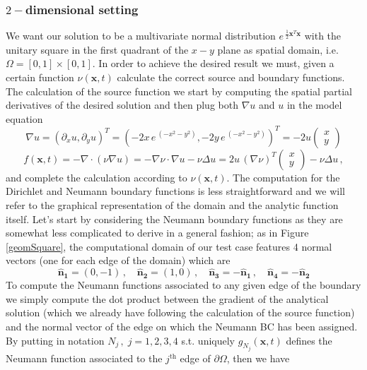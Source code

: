 \documentclass[12pt,openany,twoside,a4paper]{article}
\begin{document}
\subsubsection{$2-$dimensional setting}
We want our solution to be a multivariate normal distribution $e^{\:\frac{1}{2}\mathbf{x}^T\mathbf{x}}$ with the unitary square in the first quadrant of the $x-y$ plane as spatial domain, i.e. $\Omega = [0,1]\times[0,1]$. In order to achieve the desired result we must, given a certain function $\nu(\mathbf{x},t)$ calculate the correct source and boundary functions.
\newline The calculation of the source function we start by computing the spatial partial derivatives of the desired solution and then plug both $\nabla u$ and $u$ in the model equation
\begin{equation*}
    \nabla u = (\partial_xu, \partial_y u)^T = (-2x\,e^{\:(-x^2 - y^2)}, -2y\,e^{\:(-x^2 - y^2)})^T = -2u\begin{pmatrix} x \\ y \end{pmatrix}
\end{equation*}
\begin{equation}\label{eq1}
    f(\mathbf{x},t) = -\nabla\cdot(\nu\nabla u) = -\nabla\nu\cdot\nabla u - \nu\Delta u = 2u\,(\nabla\nu)^T\begin{pmatrix} x \\ y \end{pmatrix}-\nu\Delta u\,,
\end{equation}
and complete the calculation according to $\nu(\mathbf{x},t)$.
\newline The computation for the Dirichlet and Neumann boundary functions is less straightforward and we will refer to the graphical representation of the domain and the analytic function itself. Let's start by considering the Neumann boundary functions as they are somewhat less complicated to derive in a general fashion; as in Figure \ref{geomSquare}, the computational domain of our test case features 4 normal vectors (one for each edge of the domain) which are
\begin{equation*}
    \mathbf{\hat{n}_1} = (0,-1)\,,\quad\mathbf{\hat{n}_2} = (1,0)\,,\quad\mathbf{\hat{n}_3} = -\mathbf{\hat{n}_1}\,,\quad\mathbf{\hat{n}_4} = -\mathbf{\hat{n}_2}
\end{equation*}
To compute the Neumann functions associated to any given edge of the boundary we simply compute the dot product between the gradient of the analytical solution (which we already have following the calculation of the source function) and the normal vector of the edge on which the Neumann BC has been assigned. By putting in notation $N_j\,,\;j=1,2,3,4$ s.t. uniquely $g_{N_{j}}(\mathbf{x},t)$ defines the Neumann function associated to the $j^{\text{th}}$ edge of $\partial\Omega$, then we have
\end{document}

